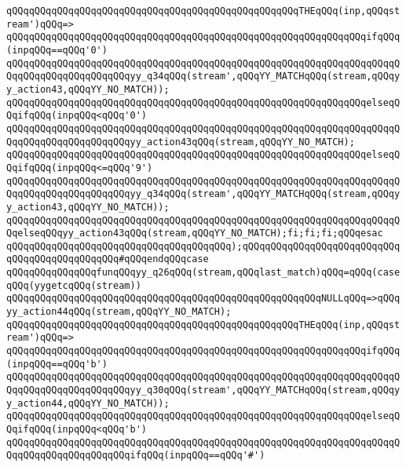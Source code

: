 \verb|qQQqqQQqqQQqqQQqqQQqqQQqqQQqqQQqqQQqqQQqqQQqqQQqqQQqTHEqQQq(inp,qQQqstream')qQQq=>|\newline
\verb|qQQqqQQqqQQqqQQqqQQqqQQqqQQqqQQqqQQqqQQqqQQqqQQqqQQqqQQqqQQqqQQqifqQQq(inpqQQq==qQQq'0')|\newline
\verb|qQQqqQQqqQQqqQQqqQQqqQQqqQQqqQQqqQQqqQQqqQQqqQQqqQQqqQQqqQQqqQQqqQQqqQQqqQQqqQQqqQQqqQQqqQQqyy_q34qQQq(stream',qQQqYY_MATCHqQQq(stream,qQQqyy_action43,qQQqYY_NO_MATCH));|\newline
\verb|qQQqqQQqqQQqqQQqqQQqqQQqqQQqqQQqqQQqqQQqqQQqqQQqqQQqqQQqqQQqqQQqelseqQQqifqQQq(inpqQQq<qQQq'0')|\newline
\verb|qQQqqQQqqQQqqQQqqQQqqQQqqQQqqQQqqQQqqQQqqQQqqQQqqQQqqQQqqQQqqQQqqQQqqQQqqQQqqQQqqQQqqQQqqQQqyy_action43qQQq(stream,qQQqYY_NO_MATCH);|\newline
\verb|qQQqqQQqqQQqqQQqqQQqqQQqqQQqqQQqqQQqqQQqqQQqqQQqqQQqqQQqqQQqqQQqelseqQQqifqQQq(inpqQQq<=qQQq'9')|\newline
\verb|qQQqqQQqqQQqqQQqqQQqqQQqqQQqqQQqqQQqqQQqqQQqqQQqqQQqqQQqqQQqqQQqqQQqqQQqqQQqqQQqqQQqqQQqqQQqyy_q34qQQq(stream',qQQqYY_MATCHqQQq(stream,qQQqyy_action43,qQQqYY_NO_MATCH));|\newline
\verb|qQQqqQQqqQQqqQQqqQQqqQQqqQQqqQQqqQQqqQQqqQQqqQQqqQQqqQQqqQQqqQQqqQQqqQQqelseqQQqyy_action43qQQq(stream,qQQqYY_NO_MATCH);fi;fi;fi;qQQqesac|\newline
\verb|qQQqqQQqqQQqqQQqqQQqqQQqqQQqqQQqqQQqqQQq);qQQqqQQqqQQqqQQqqQQqqQQqqQQqqQQqqQQqqQQqqQQqqQQq#qQQqendqQQqcase|\newline
\verb|qQQqqQQqqQQqqQQqfunqQQqyy_q26qQQq(stream,qQQqlast_match)qQQq=qQQq(caseqQQq(yygetcqQQq(stream))|\newline
\verb|qQQqqQQqqQQqqQQqqQQqqQQqqQQqqQQqqQQqqQQqqQQqqQQqqQQqqQQqNULLqQQq=>qQQqyy_action44qQQq(stream,qQQqYY_NO_MATCH);|\newline
\verb|qQQqqQQqqQQqqQQqqQQqqQQqqQQqqQQqqQQqqQQqqQQqqQQqqQQqTHEqQQq(inp,qQQqstream')qQQq=>|\newline
\verb|qQQqqQQqqQQqqQQqqQQqqQQqqQQqqQQqqQQqqQQqqQQqqQQqqQQqqQQqqQQqqQQqifqQQq(inpqQQq==qQQq'b')|\newline
\verb|qQQqqQQqqQQqqQQqqQQqqQQqqQQqqQQqqQQqqQQqqQQqqQQqqQQqqQQqqQQqqQQqqQQqqQQqqQQqqQQqqQQqqQQqqQQqyy_q30qQQq(stream',qQQqYY_MATCHqQQq(stream,qQQqyy_action44,qQQqYY_NO_MATCH));|\newline
\verb|qQQqqQQqqQQqqQQqqQQqqQQqqQQqqQQqqQQqqQQqqQQqqQQqqQQqqQQqqQQqqQQqelseqQQqifqQQq(inpqQQq<qQQq'b')|\newline
\verb|qQQqqQQqqQQqqQQqqQQqqQQqqQQqqQQqqQQqqQQqqQQqqQQqqQQqqQQqqQQqqQQqqQQqqQQqqQQqqQQqqQQqqQQqqQQqifqQQq(inpqQQq==qQQq'#')|\newline

